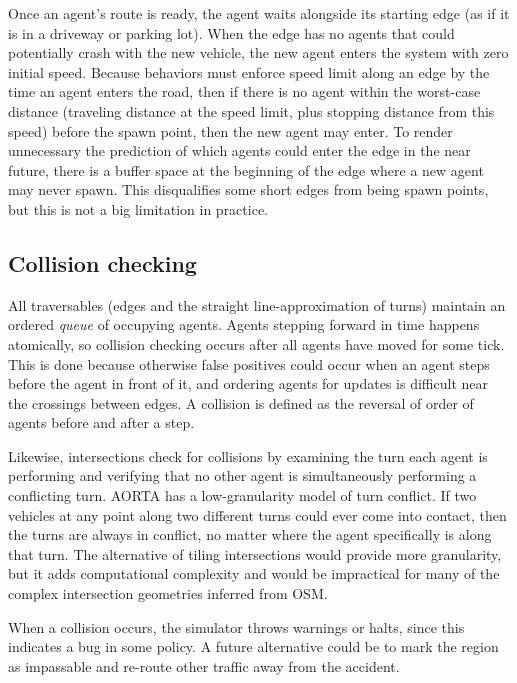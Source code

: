 \documentclass[letterpaper, 10 pt, conference]{ieeeconf}  %
\begin{document}
Once an agent's route is ready, the agent waits alongside its starting edge (as
if it is in a driveway or parking lot). When the edge has no agents that could
potentially crash with the new vehicle, the new agent enters the system with
zero initial speed.  Because behaviors must enforce speed limit along an edge by
the time an agent enters the road, then if there is no agent within the
worst-case distance (traveling distance at the speed limit, plus stopping
distance from this speed) before the spawn point, then the new agent may enter.
To render unnecessary the prediction of which agents could enter the edge in the
near future, there is a buffer space at the beginning of the edge where a new
agent may never spawn. This disqualifies some short edges from being spawn
points, but this is not a big limitation in practice.

\subsection{Collision checking}

All traversables (edges and the straight line-approximation of turns) maintain
an ordered \emph{queue} of occupying agents. Agents stepping forward in time
happens atomically, so collision checking occurs after all agents have moved for
some tick. This is done because otherwise false positives could occur when an
agent steps before the agent in front of it, and ordering agents for updates is
difficult near the crossings between edges.  A collision is
defined as the reversal of order of agents before and after a step.

Likewise, intersections check for collisions by examining the turn each agent is
performing and verifying that no other agent is simultaneously performing a
conflicting turn.  AORTA has a low-granularity model of turn conflict. If two
vehicles at any point along two different turns could ever come into contact,
then the turns are always in conflict, no matter where the agent specifically is
along that turn.  The alternative of tiling intersections \cite{JAIR08-dresner}
would provide more granularity, but it adds computational complexity and would
be impractical for many of the complex intersection geometries inferred from
OSM.

When a collision occurs, the simulator throws warnings or halts, since this
indicates a bug in some policy. A future alternative could be to mark the region
as impassable and re-route other traffic away from the accident.
\end{document}
